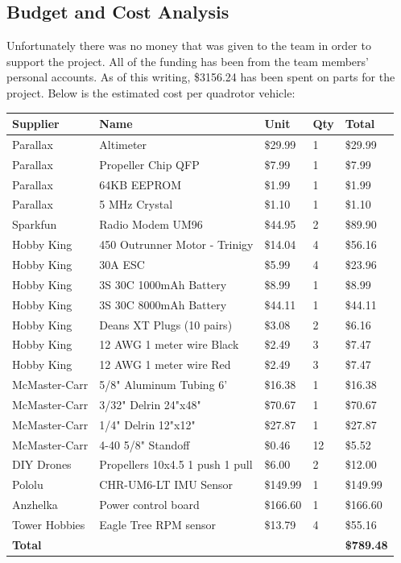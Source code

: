 \documentclass{article}
\numberwithin{equation}{section} %
\begin{document}
\subsection{Budget and Cost Analysis}
Unfortunately there was no money that was given to the team in order to support the project. All of the funding has been from the team members' personal accounts. As of this writing, \$3156.24 has been spent on parts for the project. Below is the estimated cost per quadrotor vehicle:
\newpage
\begin{longtable}{l l l l l}
	\textbf{Supplier}		&	\textbf{Name}	&	\textbf{Unit}	&	\textbf{Qty}	&	\textbf{Total}		 \\
	\hline
	Parallax		&	Altimeter	&	\$29.99	&	1	&	\$29.99		 \\
	\hline
	Parallax		&	Propeller Chip QFP	&	\$7.99	&	1	&	\$7.99		 \\
	\hline
	Parallax		&	64KB EEPROM	&	\$1.99	&	1	&	\$1.99		 \\
	\hline
	Parallax		&	5 MHz Crystal	&	\$1.10	&	1	&	\$1.10		 \\
	\hline
	Sparkfun		&	Radio Modem UM96	&	\$44.95	&	2	&	\$89.90		 \\
	\hline
	Hobby King		&	450 Outrunner Motor - Trinigy	&	\$14.04	&	4	&	\$56.16		 \\
	\hline
	Hobby King		&	30A ESC	&	\$5.99	&	4	&	\$23.96		 \\
	\hline
	Hobby King		&	3S 30C 1000mAh Battery	&	\$8.99	&	1	&	\$8.99		 \\
	\hline
	Hobby King		&	3S 30C 8000mAh Battery	&	\$44.11	&	1	&	\$44.11		 \\
	\hline
	Hobby King		&	Deans XT Plugs (10 pairs)	&	\$3.08	&	2	&	\$6.16		 \\
	\hline
	Hobby King		&	12 AWG 1 meter wire Black	&	\$2.49	&	3	&	\$7.47		 \\
	\hline
	Hobby King		&	12 AWG 1 meter wire Red	&	\$2.49	&	3	&	\$7.47		 \\
	\hline
	McMaster-Carr	&	5/8" Aluminum Tubing 6'	&	\$16.38	&	1	&	\$16.38		 \\
	\hline
	McMaster-Carr	&	3/32" Delrin 24"x48"	&	\$70.67	&	1	&	\$70.67		 \\
	\hline
	McMaster-Carr	&	1/4" Delrin 12"x12"	&	\$27.87	&	1	&	\$27.87		 \\
	\hline
	McMaster-Carr	&	4-40 5/8" Standoff	&	\$0.46	&	12	&	\$5.52		 \\
	\hline
	DIY Drones		&	Propellers 10x4.5 1 push 1 pull	&	\$6.00	&	2	&	\$12.00		 \\
	\hline
	Pololu			&	CHR-UM6-LT IMU Sensor	&	\$149.99	&	1	&	\$149.99		 \\
	\hline
	Anzhelka		&	Power control board	&	\$166.60	&	1	&	\$166.60		 \\
	\hline
	Tower Hobbies	&	Eagle Tree RPM sensor	&	\$13.79	&	4	&	\$55.16		 \\
	\hline
	\textbf{Total}	&		&		&		&	\textbf{\$789.48}
\end{longtable}
\end{document}
